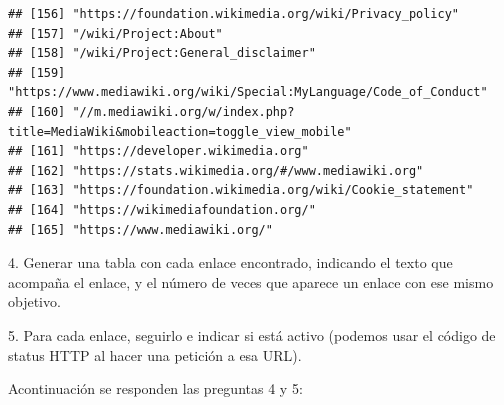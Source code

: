 \documentclass[
]{article}
\begin{document}
\begin{verbatim}
## [156] "https://foundation.wikimedia.org/wiki/Privacy_policy"                                                                        
## [157] "/wiki/Project:About"                                                                                                         
## [158] "/wiki/Project:General_disclaimer"                                                                                            
## [159] "https://www.mediawiki.org/wiki/Special:MyLanguage/Code_of_Conduct"                                                           
## [160] "//m.mediawiki.org/w/index.php?title=MediaWiki&mobileaction=toggle_view_mobile"                                               
## [161] "https://developer.wikimedia.org"                                                                                             
## [162] "https://stats.wikimedia.org/#/www.mediawiki.org"                                                                             
## [163] "https://foundation.wikimedia.org/wiki/Cookie_statement"                                                                      
## [164] "https://wikimediafoundation.org/"                                                                                            
## [165] "https://www.mediawiki.org/"
\end{verbatim}

4. Generar una tabla con cada enlace encontrado, indicando el texto que
acompaña el enlace, y el número de veces que aparece un enlace con ese
mismo objetivo.

5. Para cada enlace, seguirlo e indicar si está activo (podemos usar el
código de status HTTP al hacer una petición a esa URL).

Acontinuación se responden las preguntas 4 y 5:
\end{document}
